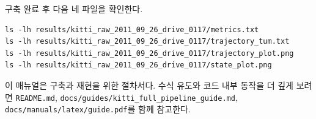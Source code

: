 \documentclass[11pt,a4paper,oneside]{report}
\begin{document}
구축 완료 후 다음 네 파일을 확인한다.

\begin{lstlisting}[style=shell]
ls -lh results/kitti_raw_2011_09_26_drive_0117/metrics.txt
ls -lh results/kitti_raw_2011_09_26_drive_0117/trajectory_tum.txt
ls -lh results/kitti_raw_2011_09_26_drive_0117/trajectory_plot.png
ls -lh results/kitti_raw_2011_09_26_drive_0117/state_plot.png
\end{lstlisting}

\begin{infobox}
이 매뉴얼은 구축과 재현을 위한 절차서다. 수식 유도와 코드 내부 동작을 더 깊게 보려면
\texttt{README.md}, \texttt{docs/guides/kitti\_full\_pipeline\_guide.md},
\texttt{docs/manuals/latex/guide.pdf}를 함께 참고한다.
\end{infobox}
\end{document}
